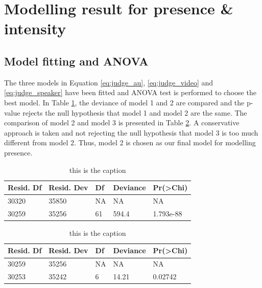 \documentclass{monashthesis}
\begin{document}
\newpage

\hypertarget{modelling-result-for-presence-intensity}{%
\section{Modelling result for presence \& intensity}\label{modelling-result-for-presence-intensity}}

\hypertarget{model-fitting-and-anova}{%
\subsection{Model fitting and ANOVA}\label{model-fitting-and-anova}}

The three models in Equation \ref{eq:judge_au}, \ref{eq:judge_video} and \ref{eq:judge_speaker} have been fitted and ANOVA test is performed to choose the best model. In Table \ref{tab:anova-1}, the deviance of model 1 and 2 are compared and the p-value rejects the null hypothesis that model 1 and model 2 are the same. The comparison of model 2 and model 3 is presented in Table \ref{tab:anova-2}. A conservative approach is taken and not rejecting the null hypothesis that model 3 is too much different from model 2. Thus, model 2 is chosen as our final model for modelling presence.

\begin{table}[ht]
\begin{center}
\caption{\label{tab:anova-1}this is the caption}
\begin{tabular}{lllll}
\toprule
Resid. Df & Resid. Dev & Df & Deviance & Pr(>Chi) \\
\midrule
30320 & 35850 & NA &    NA &        NA \\
30259 & 35256 & 61 & 594.4 & 1.793e-88 \\
\bottomrule
\end{tabular}
\end{center}
\end{table}

\begin{table}[ht]
\begin{center}
\caption{\label{tab:anova-2}this is the caption}
\begin{tabular}{lllll}
\toprule
Resid. Df & Resid. Dev & Df & Deviance & Pr(>Chi) \\
\midrule
30259 & 35256 & NA &    NA &      NA \\
30253 & 35242 &  6 & 14.21 & 0.02742 \\
\bottomrule
\end{tabular}
\end{center}
\end{table}
\end{document}
